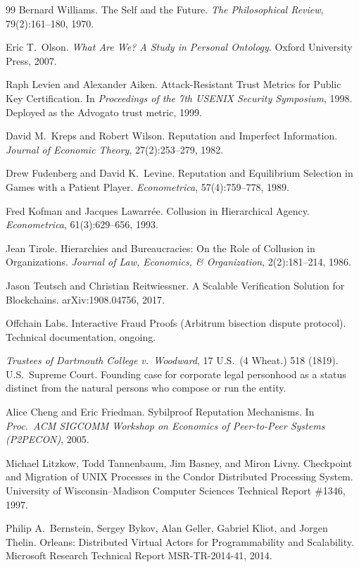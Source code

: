 \documentclass[11pt,a4paper]{article}
\theoremstyle{definition}
\newcounter{protocol}[section]
\begin{document}
\begin{thebibliography}{99}
Bernard Williams.
\newblock The Self and the Future.
\newblock \textit{The Philosophical Review}, 79(2):161--180, 1970.

Eric T.\ Olson.
\newblock \textit{What Are We? A Study in Personal Ontology}.
\newblock Oxford University Press, 2007.

Raph Levien and Alexander Aiken.
\newblock Attack-Resistant Trust Metrics for Public Key Certification.
\newblock In \textit{Proceedings of the 7th USENIX Security Symposium}, 1998.
\newblock Deployed as the Advogato trust metric, 1999.

David M.\ Kreps and Robert Wilson.
\newblock Reputation and Imperfect Information.
\newblock \textit{Journal of Economic Theory}, 27(2):253--279, 1982.

Drew Fudenberg and David K.\ Levine.
\newblock Reputation and Equilibrium Selection in Games with a Patient Player.
\newblock \textit{Econometrica}, 57(4):759--778, 1989.

Fred Kofman and Jacques Lawarrée.
\newblock Collusion in Hierarchical Agency.
\newblock \textit{Econometrica}, 61(3):629--656, 1993.

Jean Tirole.
\newblock Hierarchies and Bureaucracies: On the Role of Collusion in Organizations.
\newblock \textit{Journal of Law, Economics, \& Organization}, 2(2):181--214, 1986.

Jason Teutsch and Christian Reitwiessner.
\newblock A Scalable Verification Solution for Blockchains.
\newblock arXiv:1908.04756, 2017.

Offchain Labs.
\newblock Interactive Fraud Proofs (Arbitrum bisection dispute protocol).
\newblock Technical documentation, ongoing.

\textit{Trustees of Dartmouth College v.\ Woodward}, 17 U.S.\ (4 Wheat.) 518 (1819).
\newblock U.S.\ Supreme Court. Founding case for corporate legal personhood as a status distinct from the natural persons who compose or run the entity.

Alice Cheng and Eric Friedman.
\newblock Sybilproof Reputation Mechanisms.
\newblock In \textit{Proc.\ ACM SIGCOMM Workshop on Economics of Peer-to-Peer Systems (P2PECON)}, 2005.

Michael Litzkow, Todd Tannenbaum, Jim Basney, and Miron Livny.
\newblock Checkpoint and Migration of UNIX Processes in the Condor Distributed Processing System.
\newblock University of Wisconsin--Madison Computer Sciences Technical Report \#1346, 1997.

Philip A.\ Bernstein, Sergey Bykov, Alan Geller, Gabriel Kliot, and Jorgen Thelin.
\newblock Orleans: Distributed Virtual Actors for Programmability and Scalability.
\newblock Microsoft Research Technical Report MSR-TR-2014-41, 2014.

\end{thebibliography}
\end{document}
